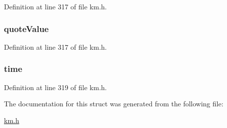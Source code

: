 Definition at line 317 of file km.\+h.

\subsubsection[{\texorpdfstring{quote\+Value}{quoteValue}}]{ quote\+Value}\hypertarget{struct_k_1_1m_profit_aa18e1bafbe0751bf4ba417df1da264d9}{}\label{struct_k_1_1m_profit_aa18e1bafbe0751bf4ba417df1da264d9}


Definition at line 317 of file km.\+h.

\subsubsection[{\texorpdfstring{time}{time}}]{ time}\hypertarget{struct_k_1_1m_profit_a8c7be9fac36539b28a92dd5240ec377b}{}\label{struct_k_1_1m_profit_a8c7be9fac36539b28a92dd5240ec377b}


Definition at line 319 of file km.\+h.



The documentation for this struct was generated from the following file\+:\begin{DoxyCompactItemize}
\item 
\hyperlink{km_8h}{km.\+h}\end{DoxyCompactItemize}
